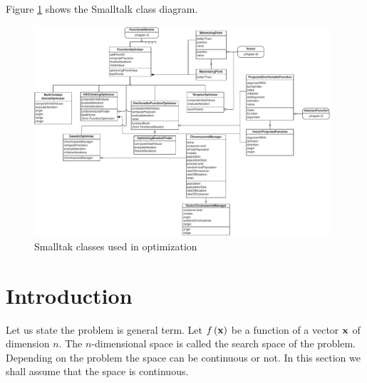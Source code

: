 Figure \ref{fig:soptimizingclasses} shows the Smalltalk class diagram.
\begin{figure}
\centering\includegraphics[width=11cm]{Figures/Optimizing}
\caption{Smalltak classes used in optimization}
\label{fig:soptimizingclasses}
\end{figure}

\section{Introduction}
\label{sec:optimum} Let us state the problem is general term. Let
$f\left({\textbf x}\right)$ be a function of a vector ${\textbf x}$ of
dimension $n$. The $n$-dimensional space is called the search
space of the problem. Depending on the problem the space can be
continuous or not. In this section we shall assume that the space
is continuous.

